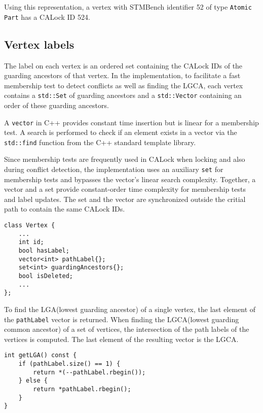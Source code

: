 Using this representation, a vertex with STMBench identifier 52 of type \texttt{Atomic Part} has a CALock ID 524.

\subsection{Vertex labels}

The label on each vertex is an ordered set containing the CALock IDs of the guarding ancestors of that vertex. In the implementation, to facilitate a fast membership test to detect conflicts as well as finding the LGCA, each vertex contains a \texttt{std::Set} of guarding ancestors and a \texttt{std::Vector} containing an order of these guarding ancestors.  

A \texttt{vector} in C++ provides constant time insertion but is linear for a membership test. A search is performed to check if an element exists in a vector via the \texttt{std::find} function from the C++ standard template library.

Since membership tests are frequently used in CALock when locking and also during conflict detection, the implementation uses an auxiliary \texttt{set} for membership tests and bypasses the vector's linear search complexity. Together, a vector and a set provide constant-order time complexity for membership tests and label updates. The set and the vector are synchronized outside the critial path to contain the same CALock IDs.

\begin{lstlisting}[caption={Vertex class with CALock label fields}]
class Vertex {
    ...
    int id;
    bool hasLabel;
    vector<int> pathLabel{};
    set<int> guardingAncestors{};
    bool isDeleted;
    ...
};

\end{lstlisting}


To find the LGA(lowest guarding ancestor) of a single vertex, the last element of the \lstinline{pathLabel} vector is returned. When finding the LGCA(lowest guarding common ancestor) of a set of vertices, the intersection of the path labels of the vertices is computed. The last element of the resulting vector is the LGCA.

\begin{lstlisting}[caption={Finding LGA using path label}]
int getLGA() const {
    if (pathLabel.size() == 1) {
        return *(--pathLabel.rbegin());
    } else {
        return *pathLabel.rbegin();
    }
}
\end{lstlisting}


